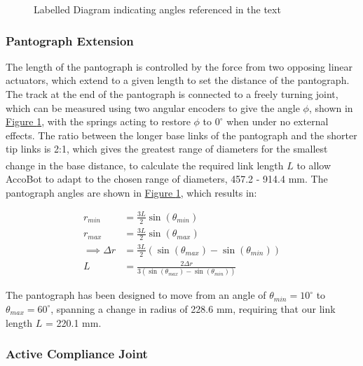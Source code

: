 \documentclass[11pt]{article}		%
\newcommand{\supercite}[1]{\textsuperscript{\cite{#1}}}		%
\newcommand{\figref}[1]{\hyperref[#1]{Figure \ref*{#1}}}    %
\begin{document}
\begin{figure}[h]
\begin{multicols}{2}
					\caption{Labelled Diagram indicating angles referenced in the text}
					\label{legDiagram}
				\end{multicols}
			\end{figure}
			
			\subsubsection{Pantograph Extension}
			
				The length of the pantograph is controlled by the force from two opposing linear actuators, which extend to a given length to set the distance of the pantograph.
				The track at the end of the pantograph is connected to a freely turning joint, which can be measured using two angular encoders to give the angle $\phi$, shown in \figref{legDiagram}, with the springs acting to restore $\phi$ to $0^\circ$ when under no external effects.
				The ratio between the longer base links of the pantograph and the shorter tip links is 2:1, which gives the greatest range of diameters for the smallest change in the base distance\supercite{okada1987mogrer}, to calculate the required link length $L$ to allow AccoBot to adapt to the chosen range of diameters, 457.2 - 914.4 mm.
				The pantograph angles are shown in \figref{legDiagram}, which results in:
				
				\begin{align}
					r_{min} &= \frac{3L}{2} \sin \left( \theta_{min} \right) \label{rMin}
					\\
					r_{max} &= \frac{3L}{2} \sin \left( \theta_{max} \right)
					\\
					\implies \Delta r &= \frac{3L}{2} \left( \sin \left( \theta_{max} \right) - \sin \left( \theta_{min} \right) \right)
					\\
					L &= \frac{2 \Delta r}{3 \left( \sin \left( \theta_{max} \right) - \sin \left( \theta_{min} \right) \right)}
				\end{align}
							
				The pantograph has been designed to move from an angle of $\theta_{min} = 10^\circ$ to $\theta_{max} = 60^\circ$, spanning a change in radius of 228.6 mm, requiring that our link length $L$ = 220.1 mm.
			
			\subsubsection{Active Compliance Joint}
			
\end{document}

